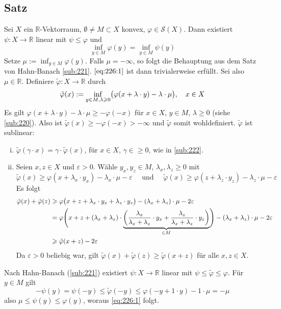 \subsection[Satz (Hahn-Banach): Existenz einer linearen Fortsetzung (mit konvexer Teilmenge)]{Satz} %
\label{sub:226}
Sei $X$ ein $\mathds{R}$-Vektorraum, $\emptyset \not= M \subset X$ konvex, $\varphi \in \mathcal{S}(X)$. Dann existiert $\psi \colon X \to \mathds{R}$ linear mit 
$\psi \le \varphi$ und 
\begin{equation*}
	\inf_{y \in M} \varphi(y) = \inf_{y \in M} \psi(y) \label{eq:226:1}\tag{*}
\end{equation*}
Setze $\mu := \inf_{y \in M} \varphi(y)$. Falls $\mu = -\infty$, so folgt die Behauptung aus dem Satz von Hahn-Banach \ref{sub:221}. $\eqref{eq:226:1}$ ist dann 
trivialerweise erfüllt. Sei also $\mu \in \mathds{R}$. Definiere $\tilde{\varphi} \colon X \to \mathds{R}$ durch
\[
	\tilde{\varphi}(x) := \inf_{y \in M, \lambda  \ge 0} \enbrace[\big]{ \varphi(x+ \lambda \cdot y) - \lambda  \cdot \mu} , \quad x \in X
\]
Es gilt $\varphi(x + \lambda \cdot y)- \lambda \cdot \mu \ge - \varphi(-x)$ für $x \in X$, $y\in M$, $\lambda \ge 0$ (siehe \ref{sub:220}). Also ist 
$\tilde{\varphi}(x) \ge - \varphi(-x) >-\infty$ und $\tilde{\varphi}$ somit wohldefiniert. $\tilde{\varphi}$ ist sublinear:
\begin{enumerate}[(i)]
	\item $\tilde{\varphi}(\gamma \cdot x) = \gamma \cdot \tilde{\varphi}(x)$, für $x \in X$, $\gamma \in \ge 0$, wie in \ref{sub:222}.
	\item Seien $x,z \in X$ und $\varepsilon>0$. Wähle $y_x, y_z \in M$, $\lambda_x, \lambda_z \ge 0$ mit
	\[
		\tilde{\varphi}(x) \ge \varphi (x +\lambda_x \cdot y_x) - \lambda_x \cdot \mu -\varepsilon \quad \text{ und }\quad 
		\tilde{\varphi}(x) \ge \varphi (z +\lambda_z \cdot y_z) - \lambda_z \cdot \mu -\varepsilon
	\] 
	Es folgt 
	\begin{align*}
		\tilde{\varphi}(x) + \tilde{\varphi}(z) &\ge \varphi \enbrace[\big]{x+z+ \lambda_x \cdot y_x + \lambda_z \cdot y_z} - (\lambda_x + \lambda_z) \cdot \mu 
		- 2 \varepsilon \\
		&= \varphi \enbrace[\Bigg]{x+z + (\lambda_x+ \lambda_z)\cdot \underbrace{\enbrace*{\frac{\lambda_x}{\lambda_x + \lambda_z} \cdot y_x + \frac{\lambda_z}{\lambda_x + \lambda_z} \cdot y_z }}_{\in M} } - (\lambda_x + \lambda_z) \cdot \mu -2 \varepsilon \\
		&\ge \tilde{\varphi}(x+z) - 2 \varepsilon
	\end{align*}
	Da $\varepsilon>0$ beliebig war, gilt $\tilde{\varphi}(x) + \tilde{\varphi}(z) \ge \tilde{\varphi}(x+z)$ für alle $x,z \in X$.
\end{enumerate}
Nach Hahn-Banach (\ref{sub:221}) existiert $\psi \colon X \to \mathds{R}$ linear mit $\psi \le \tilde{\varphi} \le \varphi$. Für $y \in M$ gilt 
\[
	-\psi(y) = \psi(-y) \le \tilde{\varphi}(-y) \le \varphi(-y + 1 \cdot y)- 1 \cdot \mu= -\mu
\]
also $\mu \le \psi(y) \le \varphi(y)$, woraus \eqref{eq:226:1} folgt. \bewende

